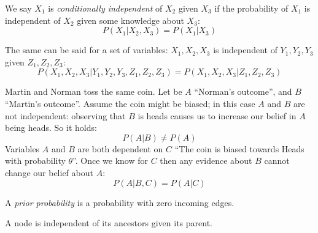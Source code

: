 \documentclass[12pt, a4paper]{report}
\newtheorem[style=M,bodystyle=\normalfont]{theorem}{Theorem}
\newtheorem[style=M,bodystyle=\normalfont]{corollary}{Corollary}
\newtheorem[style=M,bodystyle=\normalfont]{lemma}{Lemma}
\newtheorem[style=M,bodystyle=\normalfont]{definition}{Definition}
\begin{document}
    \begin{definition}
        We say $X_1$ is \emph{conditionally independent} of $X_2$ given $X_3$ if the probability of $X_1$ is independent of $X_2$ given some
        knowledge about $X_3$:
        \[P(X_1|X_2,X_3)=P(X_1|X_3)\]
    \end{definition}
    The same can be said for a set of variables: $X_1,X_2,X_3$ is independent of $Y_1,Y_2,Y_3$ given $Z_1,Z_2,Z_3$:
    \[P(X_1,X_2,X_3|Y_1,Y_2,Y_3,Z_1,Z_2,Z_3)=P(X_1,X_2,X_3|Z_1,Z_2,Z_3)\]
    \begin{example}
        Martin and Norman toss the same coin. Let be $A$ “Norman's outcome”, and $B$ “Martin's outcome”. Assume the coin might be biased; 
        in this case $A$ and $B$ are not independent: observing that $B$ is heads causes us to increase our belief in $A$ being heads. So
        it holds: 
        \[P(A|B) \neq P(A)\]
        Variables $A$ and $B$ are both dependent on $C$ “The coin is biased towards Heads with probability $\theta$”. Once we know for 
        $C$ then any evidence about $B$ cannot change our belief about $A$:
        \[P(A|B,C)=P(A|C)\]
    \end{example}
    \begin{definition}
        A \emph{prior probability} is a probability with zero incoming edges. 
    \end{definition}
    A node is independent of its ancestors given its parent. 
\end{document}
